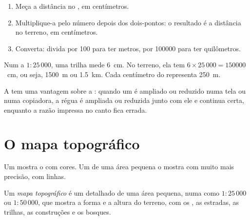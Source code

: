 \begin{method}
\begin{enumerate}
  \item Meça a distância no , em centímetros.
  \item Multiplique-a pelo número depois dos dois-pontos: o resultado é a
        distância no terreno, em centímetros.
  \item Converta: divida por 100 para ter metros, por \num{100000} para
        ter quilômetros.
\end{enumerate}
\end{method}

\begin{example}
Num  a $1 : 25\,000$, uma trilha mede \qty{6}{cm}. No terreno, ela
tem $6 \times 25\,000 = \num{150000}$~cm, ou seja, \qty{1500}{m} ou
\qty{1.5}{km}. Cada centímetro do  representa \qty{250}{m}.
\end{example}

A  tem uma vantagem sobre a : quando um 
é ampliado ou reduzido numa tela ou numa copiadora, a régua é ampliada ou
reduzida junto com ele e continua certa, enquanto a razão impressa no
canto fica errada.

\section{O mapa topográfico}

Um  mostra o  com cores. Um  de uma área pequena o
mostra com muito mais precisão, com linhas.

\begin{definition}\label{def:g9:maps-of-the-earth:topographic-map}
Um \emph{mapa topográfico} é um
 detalhado de uma área pequena, numa  como $1 : 25\,000$ ou
$1 : 50\,000$, que mostra a forma e a altura do terreno, com os , as
estradas, as trilhas, as construções e os bosques.
\end{definition}

